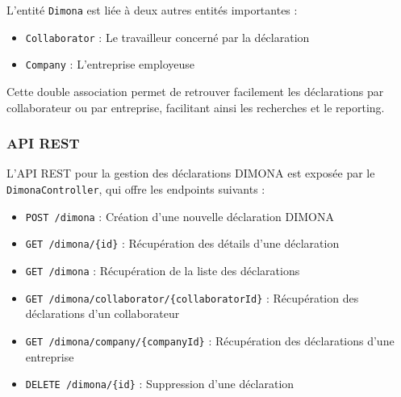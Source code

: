 \vspace{0.5cm}

L'entité \texttt{Dimona} est liée à deux autres entités importantes :
\begin{itemize}[leftmargin=*,label=\textcolor{darkgray}{$\bullet$},itemsep=0.3em]
  \item \texttt{Collaborator} : Le travailleur concerné par la déclaration
  \item \texttt{Company} : L'entreprise employeuse
\end{itemize}

\vspace{0.5cm}

\begin{note}
Cette double association permet de retrouver facilement les déclarations par collaborateur ou par entreprise, facilitant ainsi les recherches et le reporting.
\end{note}

\subsubsection{API REST}

L'API REST pour la gestion des déclarations DIMONA est exposée par le \texttt{DimonaController}, qui offre les endpoints suivants :

\vspace{0.5cm}

\begin{tcolorbox}[
  title={\textbf{Endpoints de gestion des déclarations DIMONA}},
  colback=blue!5!white,
  colframe=primarycolor,
  fonttitle=\bfseries,
  boxrule=0.5mm,
  arc=2mm,
  left=6mm,
  right=6mm,
  top=6mm,
  bottom=6mm
]
\begin{itemize}[leftmargin=*,label=\textcolor{darkgray}{$\bullet$},itemsep=0.3em]
  \item \texttt{POST /dimona} : Création d'une nouvelle déclaration DIMONA
  \item \texttt{GET /dimona/\{id\}} : Récupération des détails d'une déclaration
  \item \texttt{GET /dimona} : Récupération de la liste des déclarations
  \item \texttt{GET /dimona/collaborator/\{collaboratorId\}} : Récupération des déclarations d'un collaborateur
  \item \texttt{GET /dimona/company/\{companyId\}} : Récupération des déclarations d'une entreprise
  \item \texttt{DELETE /dimona/\{id\}} : Suppression d'une déclaration
\end{itemize}
\end{tcolorbox}

